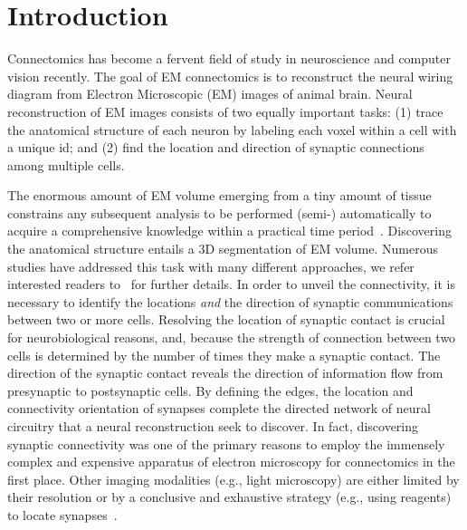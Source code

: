 \documentclass{llncs}
\begin{document}
\section{Introduction}

Connectomics has become a fervent field of study in neuroscience and computer vision recently. The goal of EM connectomics is to reconstruct the neural wiring diagram from Electron Microscopic (EM) images of animal brain. Neural reconstruction of EM images consists of two equally important tasks: (1) trace the anatomical structure of each neuron by labeling each voxel within a cell with a unique id; and (2) find the location and direction of synaptic connections among multiple cells.

The enormous amount of EM volume emerging from a tiny amount of tissue constrains any subsequent analysis to be performed (semi-) automatically to acquire a comprehensive knowledge within a practical time period~\cite{jain10opinion}\cite{helmstaedter15}. Discovering the anatomical structure entails a 3D segmentation of EM volume. Numerous studies have addressed this task with many different approaches, we refer interested readers to~\cite{funke17arxiv}\cite{lee17superhuman}\cite{januszewski16flood}\cite{parag2015ICCV} \cite{liu16eccv}\cite{parag14}\cite{beier2017MulticutBA} for further details. In order to unveil the connectivity, it is necessary to identify the locations \emph{and} the direction of synaptic communications between two or more cells. Resolving the location of synaptic contact is crucial for neurobiological reasons, and, because the strength of connection between two cells is determined by the number of times they make a synaptic contact. The direction of the synaptic contact reveals the direction of information flow from presynaptic to postsynaptic cells. By defining the edges, the location and connectivity orientation of synapses complete the directed network of neural circuitry that a neural reconstruction seek to discover. In fact, discovering synaptic connectivity was one of the primary reasons to employ the immensely complex and expensive apparatus of electron microscopy for connectomics in the first place. Other imaging modalities (e.g., light microscopy) are either limited by their resolution or by a conclusive and exhaustive strategy (e.g., using reagents) to locate synapses~\cite{morgan13whynot}\cite{denk12}\cite{lichtman14bigdata}. 
\end{document}
